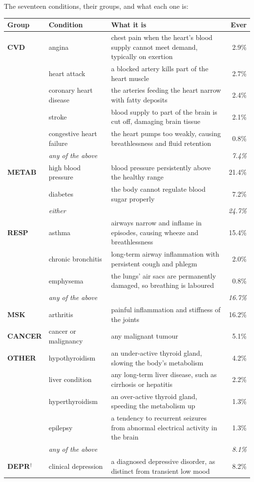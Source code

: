 \documentclass[11pt]{article}
\begin{document}
The seventeen conditions, their groups, and what each one is:

\begin{center}\small
\begin{tabular}{llp{6.5cm}r}
\toprule
Group & Condition & What it is & Ever \\
\midrule
\textbf{CVD} & angina & chest pain when the heart's blood supply cannot meet demand, typically on exertion & 2.9\% \\
 & heart attack & a blocked artery kills part of the heart muscle & 2.7\% \\
 & coronary heart disease & the arteries feeding the heart narrow with fatty deposits & 2.4\% \\
 & stroke & blood supply to part of the brain is cut off, damaging brain tissue & 2.1\% \\
 & congestive heart failure & the heart pumps too weakly, causing breathlessness and fluid retention & 0.8\% \\
 & \emph{any of the above} & & \emph{7.4\%} \\
\addlinespace
\textbf{METAB} & high blood pressure & blood pressure persistently above the healthy range & 21.4\% \\
 & diabetes & the body cannot regulate blood sugar properly & 7.2\% \\
 & \emph{either} & & \emph{24.7\%} \\
\addlinespace
\textbf{RESP} & asthma & airways narrow and inflame in episodes, causing wheeze and breathlessness & 15.4\% \\
 & chronic bronchitis & long-term airway inflammation with persistent cough and phlegm & 2.0\% \\
 & emphysema & the lungs' air sacs are permanently damaged, so breathing is laboured & 0.8\% \\
 & \emph{any of the above} & & \emph{16.7\%} \\
\addlinespace
\textbf{MSK} & arthritis & painful inflammation and stiffness of the joints & 16.2\% \\
\addlinespace
\textbf{CANCER} & cancer or malignancy & any malignant tumour & 5.1\% \\
\addlinespace
\textbf{OTHER} & hypothyroidism & an under-active thyroid gland, slowing the body's metabolism & 4.2\% \\
 & liver condition & any long-term liver disease, such as cirrhosis or hepatitis & 2.2\% \\
 & hyperthyroidism & an over-active thyroid gland, speeding the metabolism up & 1.3\% \\
 & epilepsy & a tendency to recurrent seizures from abnormal electrical activity in the brain & 1.3\% \\
 & \emph{any of the above} & & \emph{8.1\%} \\
\addlinespace
\textbf{DEPR}$^{\dagger}$ & clinical depression & a diagnosed depressive disorder, as distinct from transient low mood & 8.2\% \\
\bottomrule
\end{tabular}


\end{center}
\end{document}
